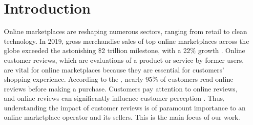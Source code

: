 \documentclass[msom,blindrev]{informs3}
\begin{document}
	\maketitle
	
	
	
	\section{Introduction}
	
	
	Online marketplaces are reshaping numerous sectors, ranging from retail to clean technology. In 2019, gross merchandise sales of top online marketplaces across the globe exceeded the astonishing \$2 trillion milestone, with a 22\% growth \citep{onlinemarket}. Online customer reviews, which are evaluations of a product or service by former users, are vital for online marketplaces because they are essential for customers' shopping experience. According to the \cite{Northwestern}, nearly 95\% of customers read online reviews before making a purchase.
	Customers pay attention to online reviews, and online reviews can significantly influence customer perception \citep{askalidis2016value,reviewmatter}. Thus, understanding the impact of customer reviews is of paramount importance to an online marketplace operator and its sellers. This is the main focus of our work.
	
\end{document}
